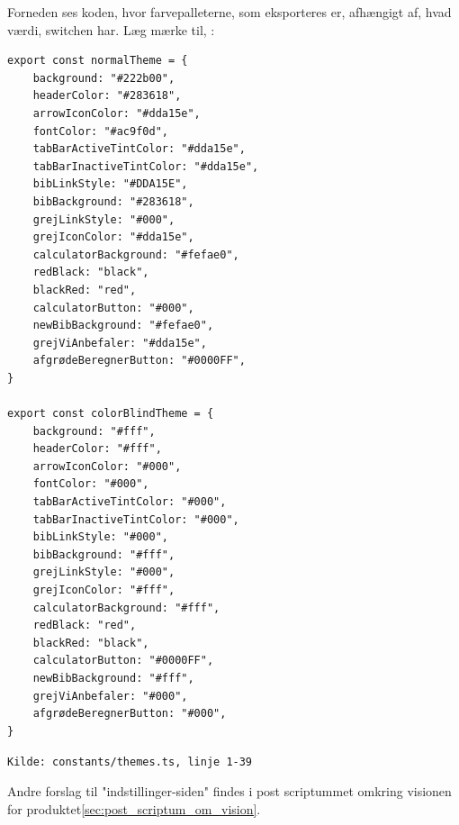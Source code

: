Forneden ses koden, hvor farvepalleterne, som eksporteres er, afhængigt af, hvad værdi, switchen har. Læg mærke til, :
\begin{mdframed}[backgroundcolor=blue!5]
\begin{verbatim}
export const normalTheme = {
    background: "#222b00",
    headerColor: "#283618",
    arrowIconColor: "#dda15e",
    fontColor: "#ac9f0d",
    tabBarActiveTintColor: "#dda15e",
    tabBarInactiveTintColor: "#dda15e",
    bibLinkStyle: "#DDA15E",
    bibBackground: "#283618",
    grejLinkStyle: "#000",
    grejIconColor: "#dda15e",
    calculatorBackground: "#fefae0",
    redBlack: "black",
    blackRed: "red",
    calculatorButton: "#000",
    newBibBackground: "#fefae0",
    grejViAnbefaler: "#dda15e",
    afgrødeBeregnerButton: "#0000FF",
}

export const colorBlindTheme = {
    background: "#fff",
    headerColor: "#fff",
    arrowIconColor: "#000",
    fontColor: "#000",
    tabBarActiveTintColor: "#000",
    tabBarInactiveTintColor: "#000",
    bibLinkStyle: "#000",
    bibBackground: "#fff",
    grejLinkStyle: "#000",
    grejIconColor: "#fff",
    calculatorBackground: "#fff",
    redBlack: "red",
    blackRed: "black",
    calculatorButton: "#0000FF",
    newBibBackground: "#fff",
    grejViAnbefaler: "#000",
    afgrødeBeregnerButton: "#000",
}
\end{verbatim}
\end{mdframed}
\footnotesize\texttt{Kilde: constants/themes.ts, linje 1-39}

Andre forslag til "indstillinger-siden" \space findes i post scriptummet omkring visionen for produktet\ref{sec:post_scriptum_om_vision}.